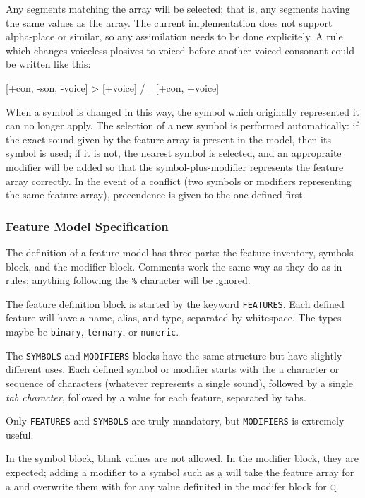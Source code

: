 \documentclass[10pt,letterpaper]{article}
\newcommand\textIPA[1]{{\fontIPA #1}}
\newcounter{excounter}
\newenvironment{vex}[1]{
  \vspace{1em}
  \refstepcounter{excounter}
  \noindent\makebox[3em][l]{(\arabic{excounter}\label{#1})}
  \minipage{\textwidth}
  \verbatim
}{
  \endverbatim
  \endminipage
  \vspace{1em}
}
\begin{document}
\noindent
Any segments matching the array will be selected; that is, any segments having the same values as the array. The current implementation does not support alpha-place or similar, so any assimilation needs to be done explicitely. A rule which changes voiceless plosives to voiced before another voiced consonant could be written like this:

\begin{vex}{ex:voicing_assimilation}
[+con, -son, -voice] > [+voice] / _[+con, +voice]
\end{vex}

When a symbol is changed in this way, the symbol which originally represented it can no longer apply. The selection of a new symbol is performed automatically: if the exact sound given by the feature array is present in the model, then its symbol is used; if it is not, the nearest symbol is selected, and an appropraite modifier will be added so that the symbol-plus-modifier represents the feature array correctly. In the event of a conflict (two symbols or modifiers representing the same feature array), precendence is given to the one defined first.

\subsubsection{Feature Model Specification}
\label{ssub:feature_model_specification}
The definition of a feature model has three parts: the feature inventory, symbols block, and the modifier block. Comments work the same way as they do as in rules: anything following the \texttt{\%} character will be ignored.

The feature definition block is started by the keyword \texttt{FEATURES}. Each defined feature will have a name, alias, and type, separated by whitespace. The types maybe be \texttt{binary}, \texttt{ternary}, or \texttt{numeric}.

The \texttt{SYMBOLS} and \texttt{MODIFIERS} blocks have the same structure but have slightly different uses. Each defined symbol or modifier starts with the a character or sequence of characters (whatever represents a single sound), followed by a single \emph{tab character}, followed by a value for each feature, separated by tabs.

Only \texttt{FEATURES} and \texttt{SYMBOLS} are truly mandatory, but \texttt{MODIFIERS} is extremely useful.

In the symbol block, blank values are not allowed. In the modifier block, they are expected; adding a modifier to a symbol such as \textIPA{a̰} will take the feature array for \textIPA{a} and overwrite them with for any value definited in the modifer block for \textIPA{◌̰}.
\end{document}
